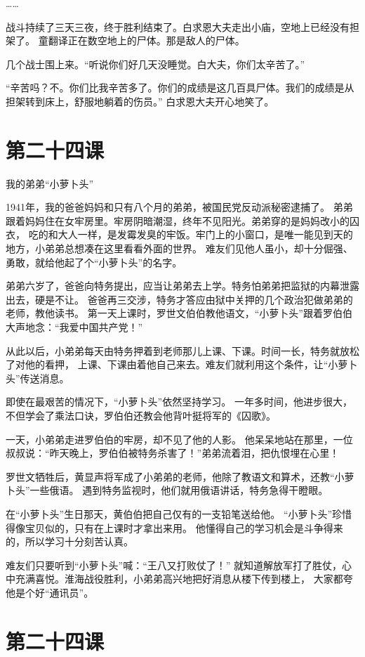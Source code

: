 \documentclass[12pt,UTF8]{ctexbook}
\begin{document}
……

战斗持续了三天三夜，终于胜利结束了。白求恩大夫走出小庙，空地上已经没有担架了。
童翻译正在数空地上的尸体。那是敌人的尸体。

几个战士围上来。“听说你们好几天没睡觉。白大夫，你们太辛苦了。”

“辛苦吗？不。你们比我辛苦多了。你们的成绩是这几百具尸体。我们的成绩是从担架转到床上，舒服地躺着的伤员。”
白求恩大夫开心地笑了。

\section{第二十四课}

我的弟弟“小萝卜头”

1941年，我的爸爸妈妈和只有八个月的弟弟，被国民党反动派秘密逮捕了。
弟弟跟着妈妈住在女牢房里。牢房阴暗潮湿，终年不见阳光。弟弟穿的是妈妈改小的囚衣，
吃的和大人一样，是发霉发臭的牢饭。牢门上的小窗口，是唯一能见到天的地方，小弟弟总想凑在这里看看外面的世界。
难友们见他人虽小，却十分倔强、勇敢，就给他起了个“小萝卜头”的名字。

弟弟六岁了，爸爸向特务提出，应当让弟弟去上学。特务怕弟弟把监狱的内幕泄露出去，硬是不让。
爸爸再三交涉，特务才答应由狱中关押的几个政治犯做弟弟的老师，教他读书。
第一天上课时，罗世文伯伯教他语文，“小萝卜头”跟着罗伯伯大声地念：“我爱中国共产党！”

从此以后，小弟弟每天由特务押着到老师那儿上课、下课。时间一长，特务就放松了对他的看押，
上课、下课由着他自己来去。难友们就利用这个条件，让“小萝卜头”传送消息。

即使在最艰苦的情况下，“小萝卜头”依然坚持学习。
一年多时间，他进步很大，不但学会了乘法口诀，罗伯伯还教会他背叶挺将军的《囚歌》。

一天，小弟弟走进罗伯伯的牢房，却不见了他的人影。
他呆呆地站在那里，一位叔叔说：“昨天晚上，罗伯伯被特务杀害了！”弟弟流着泪，把仇恨埋在心里！

罗世文牺牲后，黄显声将军成了小弟弟的老师，他除了教语文和算术，还教“小萝卜头”一些俄语。
遇到特务监视时，他们就用俄语讲话，特务急得干瞪眼。

在“小萝卜头”生日那天，黄伯伯把自己仅有的一支铅笔送给他。
“小萝卜头”珍惜得像宝贝似的，只有在上课时才拿出来用。
他懂得自己的学习机会是斗争得来的，所以学习十分刻苦认真。

难友们只要听到“小萝卜头”喊：“王八又打败仗了！”
就知道解放军打了胜仗，心中充满喜悦。淮海战役胜利，小弟弟高兴地把好消息从楼下传到楼上，
大家都夸他是个好“通讯员”。

\section{第二十四课}
\end{document}
